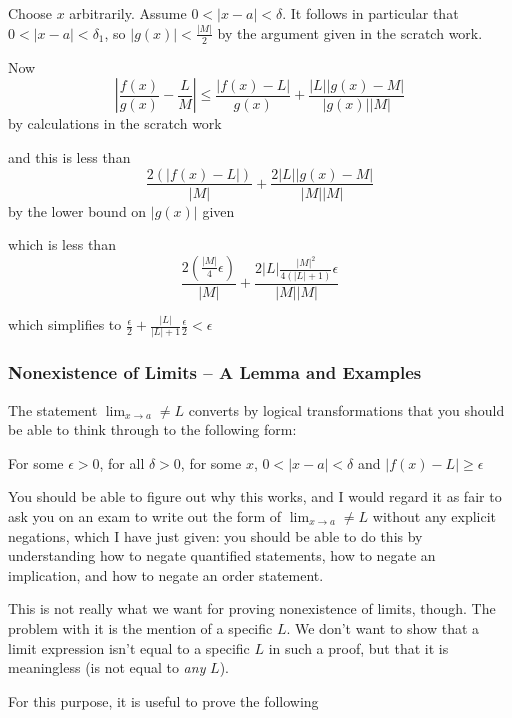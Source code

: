 \documentclass[12pt]{article}
\begin{document}
\begin{description}
Choose $x$ arbitrarily.  Assume $0<|x-a|<\delta$.  It follows in particular that $0 <|x-a|<\delta_1$, so $|g(x)| < \frac{|M|}2$ by the argument given in the scratch work.

Now $$|\frac{f(x)}{g(x)}-\frac LM| \leq \frac{|f(x)- L|}{g(x)} + \frac{|L||g(x)-M|}{|g(x)||M|}$$ by calculations in the scratch work

and this is less than $$\frac{2(|f(x)- L|)}{|M|} + \frac{2|L||g(x)-M|}{|M||M|}$$ by the lower bound on $|g(x)|$ given

which is less than 
$$\frac{2(\frac{|M|}4\epsilon)}{|M|} + \frac{2|L|\frac{|M|^2}{4(|L|+1)}\epsilon}{|M||M|}$$ 

which simplifies to  $\frac\epsilon2 + \frac{|L|}{|L|+1}\frac\epsilon2 <\epsilon$

\end{description}

\subsubsection{Nonexistence of Limits -- A Lemma and Examples}

The statement $\lim_{x \rightarrow a} \neq L$ converts by logical transformations that you should be able to think through to the following form:

For some $\epsilon>0$, for all $\delta>0$, for some $x$, $0<|x-a|<\delta$ and $|f(x)-L|\geq \epsilon$

You should be able to figure out why this works, and I would regard it as fair to ask you on an exam to write out the form of $\lim_{x \rightarrow a} \neq L$  without any explicit negations, which I have just given:  you should be able to do this by understanding how to negate quantified statements, how to negate an implication, and how to negate an order statement.

This is not really what we want for proving nonexistence of limits, though.   The problem with it is the mention of a specific $L$.  We don't want to show that a limit expression isn't equal to a specific $L$ in such a proof, but that it is meaningless (is not equal to {\em any\/} $L$).

For this purpose, it is useful to prove the following
\end{document}
